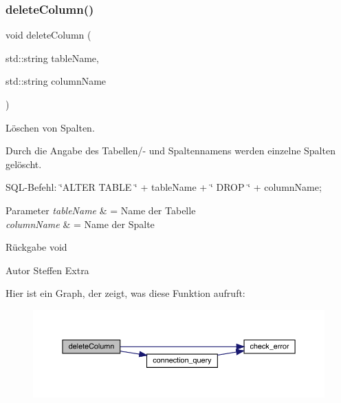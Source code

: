 \mbox{\label{tables_8hpp_aa3b10ab46a5fb3caa76745e084685e76}} 
\subsubsection{delete\+Column()}
{\footnotesize\ttfamily void delete\+Column (\begin{DoxyParamCaption}\item[{std\+::string}]{table\+Name,  }\item[{std\+::string}]{column\+Name }\end{DoxyParamCaption})}



Löschen von Spalten. 

Durch die Angabe des Tabellen/-\/ und Spaltennamens werden einzelne Spalten gelöscht.

S\+Q\+L-\/\+Befehl\+: \char`\"{}\+A\+L\+T\+E\+R T\+A\+B\+L\+E \char`\"{} + table\+Name + \char`\"{} D\+R\+O\+P \char`\"{} + column\+Name;


\begin{DoxyParams}{Parameter}
{\em table\+Name} & = Name der Tabelle \\
\hline
{\em column\+Name} & = Name der Spalte\\
\hline
\end{DoxyParams}
\begin{DoxyReturn}{Rückgabe}
void
\end{DoxyReturn}
\begin{DoxyAuthor}{Autor}
Steffen Extra 
\end{DoxyAuthor}
Hier ist ein Graph, der zeigt, was diese Funktion aufruft\+:\nopagebreak
\begin{figure}[H]
\begin{center}
\leavevmode
\includegraphics[width=350pt]{tables_8hpp_aa3b10ab46a5fb3caa76745e084685e76_cgraph}
\end{center}
\end{figure}
\mbox{\label{tables_8hpp_a36d0f9bb1b86a8155d7551fcd014b4da}} 
